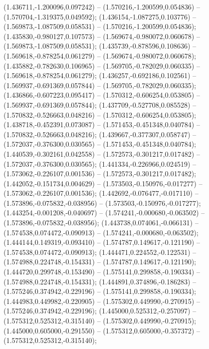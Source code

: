  (1.436711,-1.200096,0.097242) -- (1.570216,-1.200599,0.054836) -- (1.570704,-1.319375,0.049592);
 (1.436154,-1.087275,0.103776) -- (1.569873,-1.087509,0.058531) -- (1.570216,-1.200599,0.054836);
 (1.435830,-0.980127,0.107573) -- (1.569674,-0.980072,0.060678) -- (1.569873,-1.087509,0.058531);
 (1.435739,-0.878596,0.108636) -- (1.569618,-0.878254,0.061279) -- (1.569674,-0.980072,0.060678);
 (1.435882,-0.782630,0.106965) -- (1.569705,-0.782029,0.060335) -- (1.569618,-0.878254,0.061279);
 (1.436257,-0.692186,0.102561) -- (1.569937,-0.691369,0.057844) -- (1.569705,-0.782029,0.060335);
 (1.436866,-0.607223,0.095417) -- (1.570312,-0.606254,0.053805) -- (1.569937,-0.691369,0.057844);
 (1.437709,-0.527708,0.085528) -- (1.570832,-0.526663,0.048216) -- (1.570312,-0.606254,0.053805);
 (1.438718,-0.452391,0.073087) -- (1.571453,-0.451348,0.040784) -- (1.570832,-0.526663,0.048216);
 (1.439667,-0.377307,0.058747) -- (1.572037,-0.376300,0.030565) -- (1.571453,-0.451348,0.040784);
 (1.440539,-0.302161,0.042558) -- (1.572573,-0.301217,0.017482) -- (1.572037,-0.376300,0.030565);
 (1.441334,-0.226966,0.024519) -- (1.573062,-0.226107,0.001536) -- (1.572573,-0.301217,0.017482);
 (1.442052,-0.151734,0.004629) -- (1.573503,-0.150976,-0.017277) -- (1.573062,-0.226107,0.001536);
 (1.442692,-0.076477,-0.017110) -- (1.573896,-0.075832,-0.038956) -- (1.573503,-0.150976,-0.017277);
 (1.443254,-0.001208,-0.040697) -- (1.574241,-0.000680,-0.063502) -- (1.573896,-0.075832,-0.038956);
 (1.443738,0.074061,-0.066131) -- (1.574538,0.074472,-0.090913) -- (1.574241,-0.000680,-0.063502);
 (1.444144,0.149319,-0.093410) -- (1.574787,0.149617,-0.121190) -- (1.574538,0.074472,-0.090913);
 (1.444471,0.224552,-0.122531) -- (1.574988,0.224748,-0.154331) -- (1.574787,0.149617,-0.121190);
 (1.444720,0.299748,-0.153490) -- (1.575141,0.299858,-0.190334) -- (1.574988,0.224748,-0.154331);
 (1.444891,0.374896,-0.186283) -- (1.575246,0.374942,-0.229196) -- (1.575141,0.299858,-0.190334);
 (1.444983,0.449982,-0.220905) -- (1.575302,0.449990,-0.270915) -- (1.575246,0.374942,-0.229196);
 (1.445000,0.525312,-0.257097) -- (1.575312,0.525312,-0.315140) -- (1.575302,0.449990,-0.270915);
 (1.445000,0.605000,-0.291550) -- (1.575312,0.605000,-0.357372) -- (1.575312,0.525312,-0.315140);
